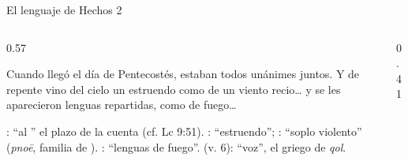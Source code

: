 \begin{frame}{El lenguaje de Hechos 2}
\begin{columns}[c,onlytextwidth]
\begin{column}{0.57\textwidth}
\begin{cita}Cuando llegó el día de Pentecostés, estaban todos unánimes juntos. Y de repente vino del cielo un estruendo como de un viento recio\ldots{} y se les aparecieron lenguas repartidas, como de fuego\ldots{}\end{cita}
\scriptsize\RaggedRight
{}: ``al '' el plazo de la cuenta (cf. Lc 9:51).
: ``estruendo''; : ``soplo violento'' (\emph{pnoē}, familia de ).
: ``lenguas  de fuego''.
 (v. 6): ``voz'', el griego de \emph{qol}.
\end{column}
\begin{column}{0.41\textwidth}\end{column}
\end{columns}
\end{frame}

